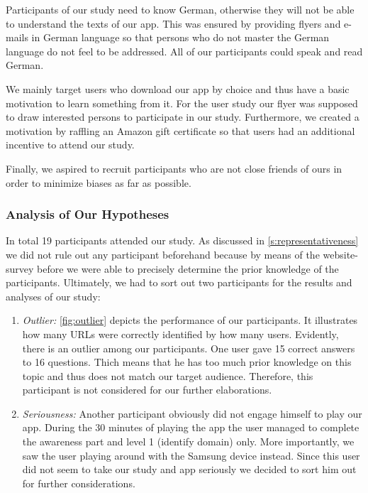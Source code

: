 \begin{description}[leftmargin=0cm]
	\item[Language:] Participants of our study need to know German, otherwise they will not be able to understand the texts of our app. This was ensured by providing flyers and e-mails in German language so that persons who do not master the German language do not feel to be addressed.
All of our participants could speak and read German.
\item[Motivation:] We mainly target users who download our app by choice and thus have a basic motivation to learn something from it.
For the user study our flyer was supposed to draw interested persons to participate in our study.
Furthermore, we created a motivation by raffling an Amazon gift certificate so that users had an additional incentive to attend our study.
\end{description}
Finally, we aspired to recruit participants who are not close friends of ours in order to minimize biases as far as possible.
\subsubsection{Analysis of Our Hypotheses}
\label{s:hypanalysis}
In total 19 participants attended our study.
As discussed in \autoref{s:representativeness} we did not rule out any participant beforehand because by means of the website-survey before we were able to precisely determine the prior knowledge of the participants.
Ultimately, we had to sort out two participants for the results and analyses of our study:

\begin{enumerate}
	\item\textit{Outlier:} \autoref{fig:outlier} depicts the performance of our participants.
	It illustrates how many URLs were correctly identified by how many users.
	Evidently, there is an outlier among our participants. 
	One user gave 15 correct answers to 16 questions.
	Thich means that he has too much prior knowledge on this topic and thus does not match our target audience.
	Therefore, this participant is not considered for our further elaborations.
	\item\textit{Seriousness:} Another participant obviously did not engage himself to play our app.
	During the 30 minutes of playing the app the user managed to complete the awareness part and level 1 (identify domain) only.
	More importantly, we saw the user playing around with the Samsung device instead.
	Since this user did not seem to take our study and app seriously we decided to sort him out for further considerations.
\end{enumerate}

